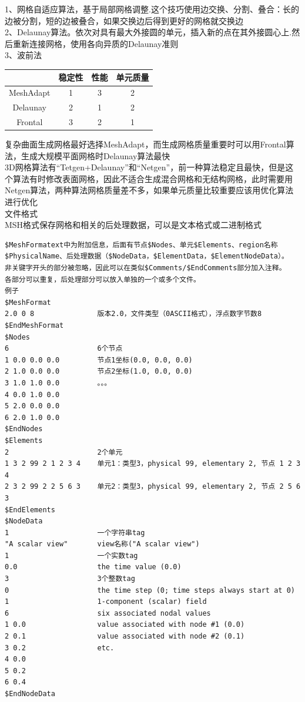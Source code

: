 \documentclass[12pt]{article}
\begin{document}
\begin{CJK}{UTF8}{gkai}
 1、网格自适应算法，基于局部网格调整.这个技巧使用边交换、分割、叠合：长的边被分割，短的边被叠合，如果交换边后得到更好的网格就交换边\\
 2、Delaunay算法。依次对具有最大外接圆的单元，插入新的点在其外接圆心上.然后重新连接网格，使用各向异质的Delaunay准则\\
 3、波前法\\

\begin{table}
	\centering
\begin{tabular}{ cccc }   
	\hline
&稳定性& 性能& 单元质量\\
\hline
MeshAdapt   & 1        & 3 &        2\\
Delaunay     &      2    &     1  &       2\\
Frontal       &        3&         2 &        1\\
\hline
\end{tabular}
\end{table}

复杂曲面生成网格最好选择MeshAdapt，而生成网格质量重要时可以用Frontal算法，生成大规模平面网格时Delaunay算法最快\\
3D网格算法有“Tetgen+Delaunay”和“Netgen”，前一种算法稳定且最快，但是这个算法有时修改表面网格，因此不适合生成混合网格和无结构网格，此时需要用Netgen算法，两种算法网格质量差不多，如果单元质量比较重要应该用优化算法进行优化\\

文件格式\\
MSH格式保存网格和相关的后处理数据，可以是文本格式或二进制格式\\
\begin{verbatim}
$MeshFormatext中为附加信息，后面有节点$Nodes、单元$Elements、region名称$PhysicalName、后处理数据（$NodeData，$ElementData，$ElementNodeData）。
非关键字开头的部分被忽略，因此可以在类似$Comments/$EndComments部分加入注释。
各部分可以重复，后处理部分可以放入单独的一个或多个文件。
例子
$MeshFormat
2.0 0 8               版本2.0，文件类型（0ASCII格式），浮点数字节数8
$EndMeshFormat
$Nodes
6                     6个节点
1 0.0 0.0 0.0         节点1坐标(0.0, 0.0, 0.0)
2 1.0 0.0 0.0         节点2坐标(1.0, 0.0, 0.0)
3 1.0 1.0 0.0         。。。
4 0.0 1.0 0.0
5 2.0 0.0 0.0
6 2.0 1.0 0.0
$EndNodes
$Elements
2                     2个单元
1 3 2 99 2 1 2 3 4    单元1：类型3，physical 99, elementary 2, 节点 1 2 3 4
2 3 2 99 2 2 5 6 3    单元2：类型3，physical 99, elementary 2, 节点 2 5 6 3
$EndElements
$NodeData
1                     一个字符串tag
"A scalar view"       view名称("A scalar view")
1                     一个实数tag
0.0                   the time value (0.0)
3                     3个整数tag
0                     the time step (0; time steps always start at 0)
1                     1-component (scalar) field
6                     six associated nodal values
1 0.0                 value associated with node #1 (0.0)
2 0.1                 value associated with node #2 (0.1)
3 0.2                 etc.
4 0.0
5 0.2
6 0.4
$EndNodeData
\end{verbatim}


    
    
   
    
    
\end{CJK}
\end{document}
